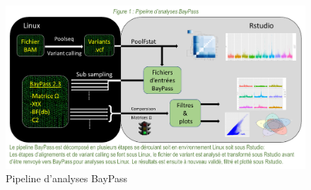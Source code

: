 \documentclass[
  openany]{book}
\begin{document}
\begin{figure}
\includegraphics[width=26.07in]{images/Analyse} \caption{Pipeline d'analyses BayPass}\label{fig:Fig1}
\end{figure}

  
\end{document}
